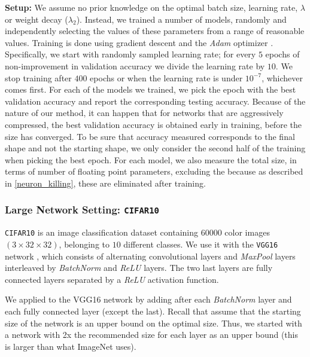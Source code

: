 \noindent\textbf{Setup: } We assume no prior knowledge on the optimal batch
size, learning rate, $\lambda$ or weight decay ($\lambda_2$). Instead, we
trained a number of models, randomly and independently selecting the values of
these parameters from a range of reasonable values. Training is done using
gradient descent and the \textit{Adam} optimizer
\cite{DBLP:journals/corr/KingmaB14}. Specifically, we start with randomly
sampled learning
rate; for every $5$ epochs of non-improvement in validation
accuracy we divide the learning rate by $10$. We stop training after $400$
epochs or when the learning rate is under $10^{-7}$, whichever comes first. For
each of the models we trained, we pick the epoch with the best validation
accuracy and report the corresponding testing accuracy. Because of the nature of
our method, it can happen that for networks that are aggressively compressed,
the best validation accuracy is obtained early in training, before the size has
converged. To be sure that accuracy measured corresponds to the final shape and
not the starting shape, we only consider the second half of the training when
picking the best epoch. For each model, we also measure the total size, in terms
of number of floating point parameters, excluding the \swls because as described
in \cref{neuron_killing}, these are eliminated after training.


\subsubsection{Large Network Setting: \texttt{CIFAR10}}


\texttt{CIFAR10} is an image classification dataset containing $60000$ color
images $(3 \times 32 \times 32)$, belonging to $10$ different classes. We use it
with the \texttt{VGG16} network \cite{Srivastava2014}, which consists of
alternating convolutional layers and \textit{MaxPool} layers interleaved by
\textit{BatchNorm} \cite{DBLP:journals/corr/IoffeS15} and \textit{ReLU}
\cite{Nair2010} layers. The two last layers are fully connected layers
separated by a \textit{ReLU} activation function.

We applied \shrink to the VGG16 network by adding \swls
after each \textit{BatchNorm} layer and each fully connected layer (except the
last). Recall that \shrink assume that the starting size of the network is
an upper bound on the optimal size. Thus, we started with a
network with 2x the recommended size for each layer as an upper bound (this
is larger than what ImageNet uses). 


